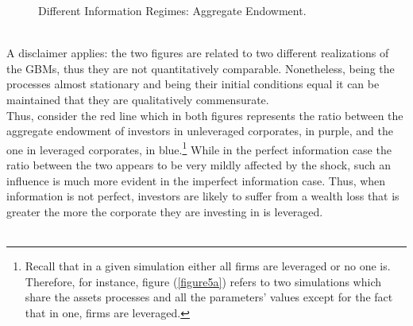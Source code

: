 \documentclass[11pt]{article}
\begin{document}
\begin{figure}[h!]
\centering
{}\quad
{}
\caption{Different Information Regimes: Aggregate Endowment.} \label{figure5}
\end{figure}\\
A disclaimer applies: the two figures are related to two different realizations of the GBMs, thus they are not quantitatively comparable. Nonetheless, being the processes almost stationary and being their initial conditions equal it can be maintained that they are qualitatively commensurate.\\ Thus, consider the red line which in both figures represents the ratio between the aggregate endowment of investors in unleveraged corporates, in purple, and the one in leveraged corporates, in blue.\footnote{Recall that in a given simulation either all firms are leveraged or no one is. Therefore, for instance, figure (\ref{figure5a}) refers to two simulations which share the assets processes and all the parameters' values except for the fact that in one, firms are leveraged.} While in the perfect information case the ratio between the two appears to be very mildly affected by the shock, such an influence is much more evident in the imperfect information case. Thus, when information is not perfect, investors are likely to suffer from a wealth loss that is greater the more the corporate they are investing in is leveraged.\\\\
\end{document}
